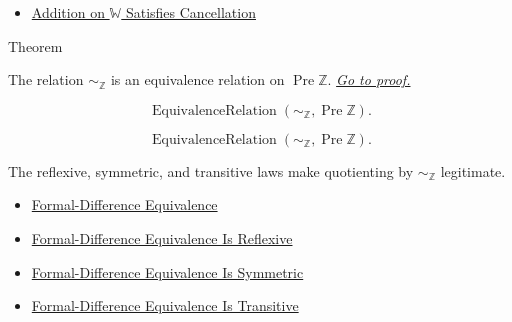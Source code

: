 \begin{dependencies}
\begin{itemize}
  \item \hyperref[thm:addition-on-w-cancellation]{Addition on $\mathbb{W}$ Satisfies Cancellation}
\end{itemize}
\end{dependencies}

\begin{theorembox}{Theorem}
\begin{theorem}
\label{thm:formal-difference-equivalence-relation}
The relation $\sim_{\mathbb{Z}}$ is an equivalence relation on
$\operatorname{Pre}\mathbb{Z}$.
\hyperref[prf:formal-difference-equivalence-relation]{\textit{Go to proof.}}
\end{theorem}
\end{theorembox}


\begin{remark*}
\[
\operatorname{EquivalenceRelation}(\sim_{\mathbb{Z}},\operatorname{Pre}\mathbb{Z}).
\]
\end{remark*}

\begin{remark*}
\[
\operatorname{EquivalenceRelation}(\sim_{\mathbb{Z}},\operatorname{Pre}\mathbb{Z}).
\]
\end{remark*}

\begin{remark*}[Interpretation]
The reflexive, symmetric, and transitive laws make quotienting by
$\sim_{\mathbb{Z}}$ legitimate.
\end{remark*}

\begin{dependencies}
\begin{itemize}
\item 
\hyperref[def:formal-difference-equivalence]{Formal-Difference Equivalence}
  \item \hyperref[lem:formal-difference-equivalence-reflexive]{Formal-Difference Equivalence Is Reflexive}
  \item \hyperref[lem:formal-difference-equivalence-symmetric]{Formal-Difference Equivalence Is Symmetric}
  \item \hyperref[lem:formal-difference-equivalence-transitive]{Formal-Difference Equivalence Is Transitive}
\end{itemize}
\end{dependencies}

